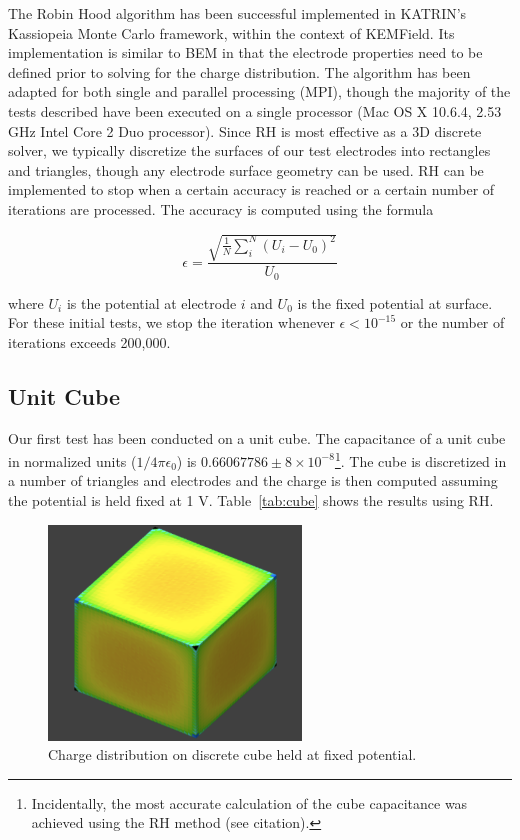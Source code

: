 The Robin Hood algorithm has been successful implemented in KATRIN's Kassiopeia Monte Carlo framework, within the context of KEMField.  Its implementation is similar to BEM in that the electrode properties need to be defined prior to solving for the charge distribution.  The algorithm has been adapted for both single and parallel processing (MPI), though the majority of the tests described have been executed on a single processor (Mac OS X 10.6.4, 2.53 GHz Intel Core 2 Duo processor).  Since RH is most effective as a 3D discrete solver, we typically discretize the surfaces of our test electrodes into rectangles and triangles, though any electrode surface geometry can be used.  RH can be implemented to stop when a certain accuracy is reached or a certain number of iterations are processed.  The accuracy is computed using the formula

\begin{equation}
\epsilon = \frac{\sqrt{\frac{1}{N}\sum_i^N (U_i - U_0)^2}}{U_0}
\end{equation}

\noindent where $U_i$ is the potential at electrode $i$ and $U_0$ is the fixed potential at surface.  For these initial tests, we stop the iteration whenever $\epsilon < 10^{-15}$ or the number of iterations exceeds 200,000.

\subsection{Unit Cube}

Our first test has been conducted on a unit cube.  The capacitance of a unit cube in normalized units ($1/4\pi\epsilon_0$) is $0.66067786 \pm 8 \times 10^{-8}$\cite{RH2}\footnote{Incidentally, the most accurate calculation of the cube capacitance was achieved using the RH method (see citation).}.  The cube is discretized in a number of triangles and electrodes and the charge is then computed assuming the potential is held fixed at 1 V.  Table~\ref{tab:cube} shows the results using RH.

\begin{figure}[htbp]
\begin{center}
\includegraphics[width=0.6\textwidth]{images/KEMFieldPlots/cube_pic.pdf}
\caption{Charge distribution on discrete cube held at fixed potential.}
\label{fig:thecube}
\end{center}
\end{figure}

